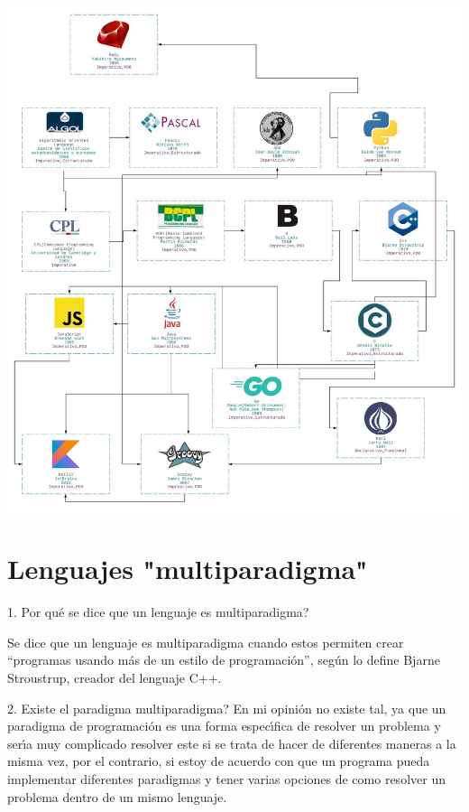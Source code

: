 \documentclass{article}
\begin{document}
\newline
\includegraphics[scale=0.4]{Diagrama_Lenguajes}

\newpage

\section{Lenguajes "multiparadigma"}

1. \textquestiondown{}Por qu\'{e} se dice que un lenguaje es multiparadigma?


Se dice que un lenguaje es multiparadigma cuando estos permiten crear \textquotedblleft{}programas usando m\'{a}s de un estilo de programaci\'{o}n\textquotedblright{}, seg\'{u}n lo define Bjarne Stroustrup, creador del lenguaje C++.


2. \textquestiondown{}Existe el paradigma multiparadigma?
En mi opini\'{o}n no existe tal, ya que un paradigma de programaci\'{o}n es una forma espec\'{\i}fica de resolver un problema y ser\'{\i}a muy complicado resolver este si se trata de hacer de diferentes maneras a la misma vez, por el contrario, si estoy de acuerdo con que un programa pueda implementar diferentes paradigmas y tener varias opciones de como resolver un problema dentro de un mismo lenguaje.
\end{document}
